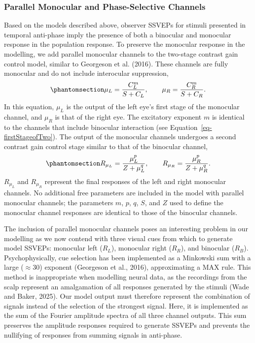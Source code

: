 \documentclass[
  12pt,
]{article}
\begin{document}
\subsubsection{Parallel Monocular and Phase-Selective
Channels}\label{parallel-monocular-and-phase-selective-channels}

Based on the models described above, observer SSVEPs for stimuli
presented in temporal anti-phase imply the presence of both a binocular
and monocular response in the population response. To preserve the
monocular response in the modelling, we add parallel monocular channels
to the two-stage contrast gain control model, similar to Georgeson et
al. (2016). These channels are fully monocular and do not include
interocular suppression,
\begin{equation}\phantomsection\label{eq-monocFirstStage}{
\mu_L = \frac{C_L^m}{S + C_L}, \qquad  \mu_R = \frac{C_R^m}{S + C_R}.
}\end{equation} In this equation, \(\mu_L\) is the output of the left
eye's first stage of the monocular channel, and \(\mu_R\) is that of the
right eye. The excitatory exponent \(m\) is identical to the channels
that include binocular interaction (see
Equation~\ref{eq-firstStageofTwo}). The output of the monocular channels
undergoes a second contrast gain control stage similar to that of the
binocular channel,
\begin{equation}\phantomsection\label{eq-monocSecondStage}{
R_{\mu_L} = \frac{\mu_L^p}{Z + \mu_L^q}, \qquad  R_{\mu_R} = \frac{\mu_R^p}{Z + \mu_R^q}.
}\end{equation} \(R_{\mu_L}\) and \(R_{\mu_R}\) represent the final
responses of the left and right monocular channels. No additional free
parameters are included in the model with parallel monocular channels;
the parameters \(m\), \(p\), \(q\), \(S\), and \(Z\) used to define the
monocular channel responses are identical to those of the binocular
channels.

The inclusion of parallel monocular channels poses an interesting
problem in our modelling as we now contend with three visual cues from
which to generate model SSVEPs: monocular left (\(R_L\)), monocular
right (\(R_R\)), and binocular (\(R_B\)). Psychophysically, cue
selection has been implemented as a Minkowski sum with a large
(\(\approx 30\)) exponent (Georgeson et al., 2016), approximating a MAX
rule. This method is inappropriate when modelling neural data, as the
recordings from the scalp represent an amalgamation of all responses
generated by the stimuli (Wade and Baker, 2025). Our model output must
therefore represent the combination of signals instead of the selection
of the strongest signal. Here, it is implemented as the sum of the
Fourier amplitude spectra of all three channel outputs. This sum
preserves the amplitude responses required to generate SSVEPs and
prevents the nullifying of responses from summing signals in anti-phase.
\end{document}
